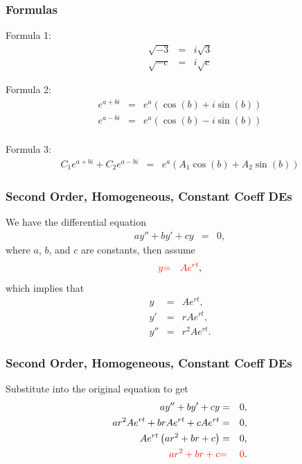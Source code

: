 \begin{frame}
  \frametitle{Formulas}
Formula 1:
  {\color{brown}
  \begin{eqnarray*}
  \sqrt{-3} & = & i\sqrt{3}\\
  \sqrt{-c} & = & i\sqrt{c}
  \end{eqnarray*}
  }

Formula 2:
  {\color{red}
  \begin{eqnarray*}
  e^{a+bi} & = & e^a (\cos(b) + i\sin(b))\\
  e^{a-bi} & = & e^a (\cos(b) - i\sin(b))\\
  \end{eqnarray*}
  }

Formula 3:
  {\color{blue}
  \begin{eqnarray*}
  C_1 e^{a+bi} + C_2  e^{a-bi} & = & e^a (A_1\cos(b) + A_2\sin(b))
  \end{eqnarray*}
  }

\end{frame}

\begin{frame}
  \frametitle{Second Order, Homogeneous, Constant Coeff DEs}

  We have the differential equation
  \begin{eqnarray*}
    a y'' + by' + cy & = & 0,
  \end{eqnarray*}
  where $a$, $b$, and $c$ are constants, then assume
  \begin{eqnarray*}
    {\color{red} y } & {\color{red} = } & {\color{red}A e^{rt}},
  \end{eqnarray*}
  which implies that
  \begin{eqnarray*}
    y   & = & A e^{rt}, \\
    y'  & = & r A e^{rt}, \\
    y'' & = & r^2 A e^{rt}.
  \end{eqnarray*}

\end{frame}

\begin{frame}
  \frametitle{Second Order, Homogeneous, Constant Coeff DEs}

  Substitute into the original equation to get
  \begin{eqnarray*}
    a y'' + by' + cy & = & 0, \\
    a r^2 A e^{rt} + b r A e^{rt} + c A e^{rt} & = & 0, \\
    A e^{rt} \left( ar^2 + br + c \right) & = & 0, \\
    {\color{red} ar^2 + br + c } & {\color{red} = } & {\color{red} 0}.
  \end{eqnarray*}

\end{frame}


